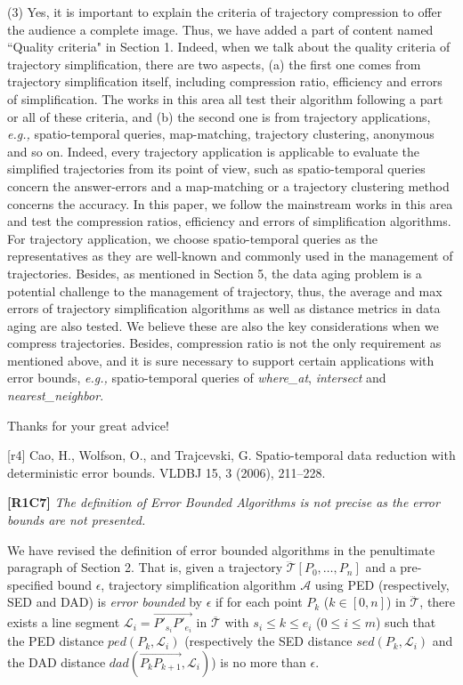 \documentclass{letter}
\newcommand{\eg}{\emph{e.g.,}\xspace}
\newcommand{\vv}{\overrightarrow}
\begin{document}
{(3) {Yes, it is important to explain the criteria of trajectory compression to offer the audience a complete image.} Thus, we have added a part of content named ``Quality criteria" in Section 1. Indeed, when we talk about the quality criteria of trajectory simplification, there are two aspects, 
(a) the first one comes from trajectory simplification itself, including compression ratio, efficiency and errors of simplification. The works in this area all test their algorithm following a part or all of these criteria, and 
(b) the second one is from trajectory applications, \eg spatio-temporal queries, map-matching, trajectory clustering, anonymous and so on. Indeed, every trajectory application is applicable to evaluate the simplified trajectories from its point of view, such as spatio-temporal queries concern the answer-errors and a map-matching or a trajectory clustering method concerns the accuracy.
%
In this paper, we follow the mainstream works in this area and test the compression ratios, efficiency and errors of simplification algorithms. For trajectory application, we choose spatio-temporal queries as the representatives as they are well-known and commonly used in the management of trajectories. Besides, as mentioned in Section 5, the data aging problem is a potential challenge to the management of trajectory, thus, the average and max errors of trajectory simplification algorithms as well as distance metrics in data aging are also tested.
%
We believe these are also the key considerations when we compress trajectories. Besides, compression ratio is not the only requirement as mentioned above, and it is sure necessary to support certain applications with error bounds, \eg spatio-temporal queries of \emph{where\_at}, \emph{intersect} and \emph{nearest\_neighbor}.

Thanks for your great advice!

[r4] Cao, H., Wolfson, O., and Trajcevski, G. Spatio-temporal data reduction with deterministic error bounds. VLDBJ 15, 3 (2006), 211–228.

\textbf{[R1C7]} \emph{ The definition of Error Bounded Algorithms is not precise as the error bounds are not presented. }

We have revised the definition of error bounded algorithms in the penultimate paragraph of Section 2. That is, given a trajectory $\dddot{\mathcal{T}}\left[P_0, \dots, P_n\right]$ and a pre-specified bound $\epsilon$,
trajectory simplification algorithm $\mathcal{A}$ using PED (respectively, SED and DAD) is \emph{error bounded} by $\epsilon$ if for each point $P_k$ ($k\in[0,n]$) in $\dddot{\mathcal{T}}$, there exists a line segment $\mathcal{L}_i = \vv{P'_{s_i}P'_{e_i}}$ in $\overline{\mathcal{T}}$ with $s_i \le k \le e_i$ ($0\le i\le m$) such that the PED distance $ped\left(P_k, \mathcal{L}_i\right)$  (respectively the SED distance $sed\left(P_k, \mathcal{L}_i\right)$ and the DAD distance $dad\left(\vv{P_{k}P_{k+1}}, \mathcal{L}_i\right)$) is no more than  $\epsilon$.

}
\end{document}
